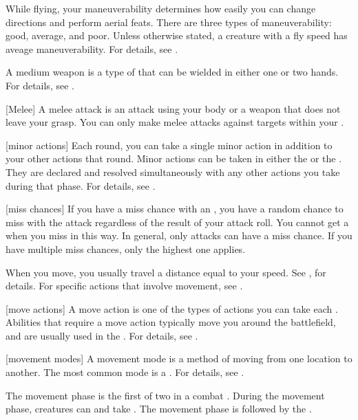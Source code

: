  While flying, your maneuverability determines how easily you can change directions and perform aerial feats.
There are three types of maneuverability: good, average, and poor.
Unless otherwise stated, a creature with a fly speed has aveage maneuverability.
For details, see .

 A medium weapon is a type of  that can be wielded in either one or two hands.
For details, see .

[Melee] A melee attack is an attack using your body or a weapon that does not leave your grasp.
You can only make melee attacks against targets within your .

[minor actions] Each round, you can take a single minor action in addition to your other actions that round.
Minor actions can be taken in either the  or the .
They are declared and resolved simultaneously with any other actions you take during that phase.
For details, see .

[miss chances] If you have a miss chance with an , you have a random chance to miss with the attack regardless of the result of your attack roll.
You cannot get a  when you miss in this way.
In general, only  attacks can have a miss chance.
If you have multiple miss chances, only the highest one applies.

 When you move, you usually travel a distance equal to your speed.
See , for details.
For specific actions that involve movement, see .

[move actions] A move action is one of the types of actions you can take each .
Abilities that require a move action typically move you around the battlefield, and are usually used in the .
For details, see .

[movement modes] A movement mode is a method of moving from one location to another.
The most common mode is a .
For details, see .

 The movement phase is the first of two  in a combat .
During the movement phase, creatures can  and take .
The movement phase is followed by the .

